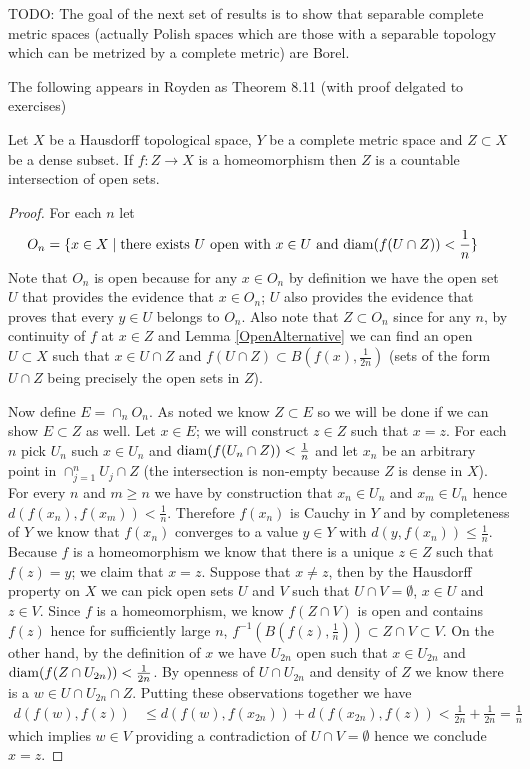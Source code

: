 TODO: The goal of the next set of results is to show that separable
complete metric spaces (actually Polish spaces which are those with
a separable topology which can be metrized by a complete metric) are Borel.

 The following appears in Royden as Theorem 8.11 (with proof delgated
to exercises)
\begin{lem}Let $X$ be a Hausdorff topological space, $Y$ be a
  complete metric space and $Z \subset X$ be a dense subset.  If $f :
  Z \to X$ is a homeomorphism then $Z$ is a countable intersection of
  open sets.
\end{lem}
\begin{proof}
For each $n$ let 
\begin{align*}
O_n &= \lbrace x \in X \mid \text{there exists $U$
  open with $x \in U$ and $\operatorname*{diam}(f(U \cap Z)) < \frac{1}{n}$} \rbrace
\end{align*}
Note that $O_n$ is open because for any $x \in O_n$ by definition we
have the open set $U$ that provides the evidence that $x \in O_n$;
$U$ also provides the evidence that proves that every $y \in U$
belongs to $O_n$.  Also
note that $Z \subset O_n$ since for any $n$, by continuity of $f$ at $x \in Z$ and Lemma
\ref{OpenAlternative}  we
can find an open $U \subset X$ such that $x \in U \cap Z$ and $f(U \cap Z) \subset B(f(x),
\frac{1}{2n})$ (sets of the form $U \cap Z$ being precisely the open
sets in $Z$).

Now define $E = \cap_n O_n$.  As noted we know $Z \subset E$ so we
will be done if we can show $E
\subset Z$ as well.  Let $x \in E$; we will construct $z \in Z$
such that $x = z$.  For each $n$ pick $U_n$ such $x \in U_n$ and $\operatorname*{diam}(f(U_n \cap Z)) <
\frac{1}{n}$ and let $x_n$ be an arbitrary point in $\cap_{j=1}^n
U_j \cap Z$ (the intersection is non-empty because $Z$ is dense in
$X$).  
For every $n$ and $m \geq n$ we have by construction that $x_n
\in U_n$ and $x_m \in U_n$ hence $d(f(x_n), f(x_m)) < \frac{1}{n}$.
Therefore $f(x_n)$ is Cauchy in
$Y$ and by completeness of $Y$ we know that $f(x_n)$ converges to a
value $y \in Y$ with $d(y, f(x_n)) \leq \frac{1}{n}$.  
Because $f$ is a homeomorphism we know that 
there is a unique $z \in Z$ such that $f(z) = y$; we claim that $x =
z$.  Suppose that $x
\neq z$, then by the Hausdorff property on $X$ we can pick open sets $U$ and
$V$ such that $U \cap V = \emptyset$, $x \in U$ and $z \in V$.  Since
$f$ is a homeomorphism, we know $f(Z \cap V)$ is open and contains
$f(z)$ hence for sufficiently large $n$, $f^{-1}(B(f(z), \frac{1}{n}))
\subset Z \cap V \subset V$.  On
the other hand, by the definition of $x$ we have $U_{2n}$ open such that
$x \in U_{2n}$ and $\operatorname*{diam}(f(Z \cap U_{2n})) < \frac{1}{2n}$.  By openness of
$U \cap U_{2n}$ and density of $Z$ we know there is a $w \in U \cap
U_{2n} \cap Z$.  Putting these observations together we have
\begin{align*}
d(f(w), f(z)) &\leq  d(f(w), f(x_{2n})) + d(f(x_{2n}), f(z)) 
< \frac{1}{2n} + \frac{1}{2n} = \frac{1}{n}
\end{align*}
which implies $w \in V$ providing a contradiction of $U \cap V =
\emptyset$ hence we conclude $x = z$.
\end{proof}

